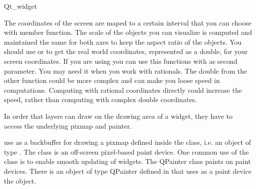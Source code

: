 \begin{ccRefClass}{Qt_widget}
\begin{ccAdvanced}
The coordinates of the screen are maped to a certain interval that you 
can choose  with  member function. The scale of the
objects you can visualize is computed and maintained the same for both 
axes to keep the aspect ratio of the objects. You should use
 or  to get the real world coordinates,
represented as a double, for your screen coordinates. If you are using
 you can use this functions with  as second
parameter. You may need it when you work with rationals. The double
from the other function could be more complex and can make you loose
speed in computations. Computing with rational coordinates directly
could increase the speed, rather than computing with complex double
coordinates.

\end{ccAdvanced}

\begin{ccAdvanced}

In order that layers can draw on the drawing area of a widget, they
have to access the underlying pixmap and painter.
 
 use as a backbuffer for drawing a pixmap
defined inside the class, i.e. an object of type . The
 class is an off-screen pixel-based paint device. One
common use of the  class is to enable smooth updating of widgets.
The QPainter class paints on paint devices. There is an object of type 
QPainter defined in  that uses as a paint device
the  object.



\end{ccAdvanced}


\end{ccRefClass}

